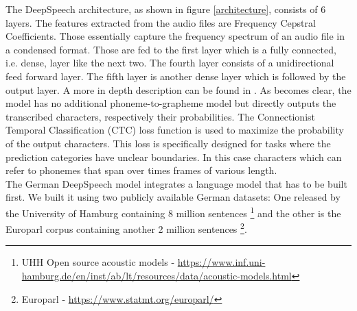 The DeepSpeech architecture, as shown in figure \ref{architecture}, consists of 6 layers. The features extracted from the audio files are Frequency Cepstral Coefficients. Those essentially capture the frequency spectrum of an audio file in a condensed format. Those are fed to the first layer which is a fully connected, i.e. dense, layer like the next two. The fourth layer consists of a unidirectional feed forward layer. The fifth layer is another dense layer which is followed by the output layer. A more in depth description can be found in \citet{Agarwal2019GermanES}. As becomes clear, the model has no additional phoneme-to-grapheme model but directly outputs the transcribed characters, respectively their probabilities. The Connectionist Temporal Classification (CTC) loss function is used to maximize the probability of the output characters. This loss is specifically designed for tasks where the prediction categories have unclear boundaries. In this case characters which can refer to phonemes that span over times frames of various length.
\\
The German DeepSpeech model integrates a language model that has to be built first. We built it using two publicly available German datasets: One released by the University of Hamburg containing 8
million sentences \footnote{UHH Open source acoustic models - \url{https://www.inf.uni-hamburg.de/en/inst/ab/lt/resources/data/acoustic-models.html}} and the other is the Europarl corpus containing another 2 million sentences
\footnote{Europarl - \url{https://www.statmt.org/europarl/}}.
